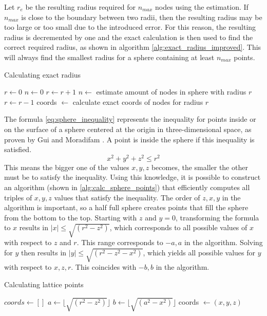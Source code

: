 Let $r_e$ be the resulting radius required for $n_{max}$ nodes using the estimation. If $n_{max}$ is close to the boundary between two radii, then the resulting radius may be too large or too small due to the introduced error. For this reason, the resulting radius is decremented by one and the exact calculation is then used to find the correct required radius, as shown in algorithm \ref{alg:exact_radius_improved}. This will always find the smallest radius for a sphere containing at least $n_{max}$ points.

\begin{algorithm}
\caption{Calculating exact radius}
\label{alg:exact_radius_improved}
\begin{algorithmic}
\State $r \gets 0$
\State $n \gets 0$
    \State $r \gets r + 1$
    \State $n \gets$ estimate amount of nodes in sphere with radius $r$
\EndWhile
\State $ r \gets r - 1$
    \State coords $\gets$ calculate exact coords of nodes for radius $r$
\EndWhile
\end{algorithmic}
\end{algorithm}

The formula \ref{eq:sphere_inequality} represents the inequality for points inside or on the surface of a sphere centered at the origin in three-dimensional space, as proven by Gui and Moradifam \cite{sphereInequality}. A point is inside the sphere if this inequality is satisfied.
\begin{equation}
\label{eq:sphere_inequality}
    x^2 + y^2 + z^2 \leq r^2
\end{equation}
This means the bigger one of the values $x,y,z$ becomes, the smaller the other must be to satisfy the inequality. Using this knowledge, it is possible to construct an algorithm (shown in \ref{alg:calc_sphere_points}) that efficiently computes all triples of $x,y,z$ values that satisfy the inequality. The order of $z,x,y$ in the algorithm is important, so a half full sphere creates points that fill the sphere from the bottom to the top.
Starting with $z$ and $y=0$, transforming the formula to $x$ results in $|x| \leq \sqrt{(r^2 - z^2)}$, which corresponds to all possible values of $x$ with respect to $z$ and $r$. This range corresponds to $-a,a$ in the algorithm. Solving for $y$ then results in $|y| \leq \sqrt{(r^2 - z^2 - x^2)}$, which yields all possible values for $y$ with respect to $x,z,r$. This coincides with $-b,b$ in the algorithm.

\begin{algorithm}
\caption{Calculating lattice points}
\label{alg:calc_sphere_points}
\begin{algorithmic}
\State $coords \gets []$
    \State $a \gets \lfloor\sqrt{(r^2 - z^2)}\rfloor$
        \State $b \gets \lfloor\sqrt{(a^2 - x^2)}\rfloor$
            \State coords $\gets (x,y,z)$
        \EndFor
    \EndFor
\EndFor
\end{algorithmic}
\end{algorithm}

